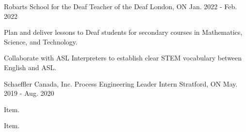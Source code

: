 

\begin{cventries}


  \cventry
    {Robarts School for the Deaf} %
    {Teacher of the Deaf} %
    {London, ON} %
    {Jan. 2022 - Feb. 2022} %
    {
      \begin{cvitems} %
        \item {Plan and deliver lessons to Deaf students for secondary courses in Mathematics, Science, and Technology.}
        \item {Collaborate with ASL Interpreters to establish clear STEM vocabulary between English and ASL.}
      \end{cvitems}
    }
    

    

  \cventry
  {Schaeffler Canada, Inc.} %
  {Process Engineering Leader Intern} %
    {Stratford, ON} %
    {May. 2019 - Aug. 2020} %
    {
      \begin{cvitems} %
        \item {Item.}
        \item {Item.}
      \end{cvitems}
    }
    

\end{cventries}
